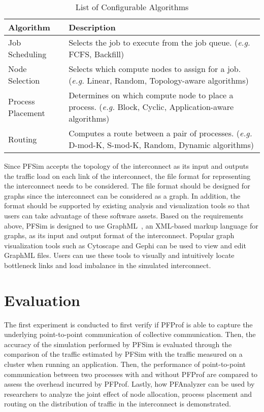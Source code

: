 \begin{table}
    \centering
    \normalsize
    \caption{List of Configurable Algorithms}%
    \label{tbl:simulator-algorithm}
    \begin{tabularx}{\linewidth}{lX}
        \toprule
        Algorithm         & Description                                                 \\
        \midrule
        Job Scheduling    & Selects the job to execute from the job queue.
                            (\emph{e.g.} FCFS, Backfill)                                \\
        Node Selection    & Selects which compute nodes to assign for a job.
                            (\emph{e.g.} Linear, Random, Topology-aware algorithms)     \\
        Process Placement & Determines on which compute node to place a process.
                            (\emph{e.g.} Block, Cyclic, Application-aware algorithms)   \\
        Routing           & Computes a route between a pair of processes.
                            (\emph{e.g.} D-mod-K, S-mod-K, Random, Dynamic algorithms)  \\
        \bottomrule
    \end{tabularx}
\end{table}

Since PFSim accepts the topology of the interconnect as its input and outputs
the traffic load on each link of the interconnect, the file format for
representing the interconnect needs to be considered. The file format should
be designed for graphs since the interconnect can be considered as a graph. In
addition, the format should be supported by existing analysis and
visualization tools so that users can take advantage of these software assets.
Based on the requirements above, PFSim is designed to use
GraphML~\autocite{Brandes2013}, an XML-based markup language for graphs, as
its input and output format of the interconnect. Popular graph visualization
tools such as Cytoscape and Gephi can be used to view and edit GraphML files.
Users can use these tools to visually and intuitively locate bottleneck links
and load imbalance in the simulated interconnect.

\section{Evaluation}\label{sec:ii-evaluation}

The first experiment is conducted to first verify if PFProf is able to capture
the underlying point-to-point communication of collective communication. Then,
the accuracy of the simulation performed by PFSim is evaluated through the
comparison of the traffic estimated by PFSim with the traffic measured on a
cluster when running an application. Then, the performance of point-to-point
communication between two processes with and without PFProf are compared to
assess the overhead incurred by PFProf. Lastly, how PFAnalyzer can be
used by researchers to analyze the joint effect of node allocation, process
placement and routing on the distribution of traffic in the interconnect is
demonstrated.

